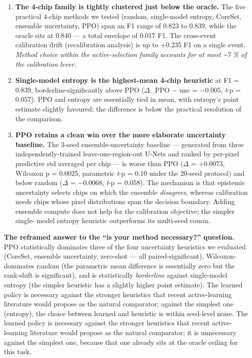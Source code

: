 \begin{enumerate}
\def\labelenumi{\arabic{enumi}.}
\tightlist
\item
  \textbf{The 4-chip family is tightly clustered just below the oracle.}
  The five practical 4-chip methods we tested (random, single-model
  entropy, CoreSet, ensemble uncertainty, PPO) span an F1 range of
  0.823 to 0.839, while the oracle sits at 0.840 --- a total envelope
  of 0.017 F1. The cross-event calibration drift (recalibration analysis) is up to +0.235
  F1 on a single event. \emph{Method choice within the active-selection
  family accounts for at most \textasciitilde7 \% of the calibration lever.}
\item
  \textbf{Single-model entropy is the highest-mean 4-chip heuristic} at
  F1 = 0.839, borderline-significantly above PPO ($\Delta$\_PPO $-$ unc = $-$0.005,
  \emph{t}-p = 0.057). PPO and entropy are essentially tied in mean, with
  entropy's point estimate slightly favoured; the difference is below
  the practical resolution of the comparison.
\item
  \textbf{PPO retains a clean win over the more elaborate uncertainty
  baseline.} The 3-seed ensemble-uncertainty baseline --- generated
  from three independently-trained leave-one-region-out U-Nets and
  ranked by per-pixel predictive std averaged per chip --- is
  worse than PPO ($\Delta$ = +0.0073, Wilcoxon p = 0.0025, parametric
  \emph{t}-p = 0.10 under the 20-seed protocol) and below random
  ($\Delta$ = $-$0.0068, \emph{t}-p = 0.058). The
  mechanism is that epistemic uncertainty selects chips on which the
  ensemble \emph{disagrees}, whereas calibration needs chips whose pixel
  distributions span the decision boundary. Adding ensemble compute
  does not help for the calibration objective; the simpler single-
  model entropy heuristic outperforms its multi-seed cousin.
\end{enumerate}

\textbf{The reframed answer to the ``is your method necessary?'' question.}
PPO statistically dominates three of the four uncertainty heuristics we
evaluated (CoreSet, ensemble uncertainty, zero-shot --- all
paired-significant), Wilcoxon-dominates random (the parametric mean
difference is essentially zero but the rank-shift is significant), and
is statistically \emph{borderline} against single-model entropy (the simpler
heuristic has a slightly higher point estimate). The learned policy is
necessary against the stronger heuristics that recent active-learning
literature would propose as the natural comparator; against the simplest
one (entropy), the choice between learned and heuristic is within
seed-level noise.
The learned policy is necessary against the stronger heuristics that
recent active-learning literature would propose as the natural
comparator; it is unnecessary against the simplest one, because that one
already sits at the oracle ceiling for this task.

